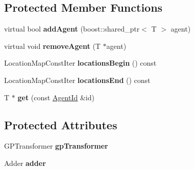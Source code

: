 \subsection*{Protected Member Functions}
\begin{DoxyCompactItemize}
\item 
\hypertarget{classrepast_1_1_base_grid_aa119b75be38ed500437d908707752c53}{virtual bool {\bfseries add\-Agent} (boost\-::shared\-\_\-ptr$<$ T $>$ agent)}\label{classrepast_1_1_base_grid_aa119b75be38ed500437d908707752c53}

\item 
\hypertarget{classrepast_1_1_base_grid_ab3a15e82c71ae8467e34adcef97eda10}{virtual void {\bfseries remove\-Agent} (T $\ast$agent)}\label{classrepast_1_1_base_grid_ab3a15e82c71ae8467e34adcef97eda10}

\item 
\hypertarget{classrepast_1_1_base_grid_af2895a0c0f8df474c70fe1f5dc9d7e79}{Location\-Map\-Const\-Iter {\bfseries locations\-Begin} () const }\label{classrepast_1_1_base_grid_af2895a0c0f8df474c70fe1f5dc9d7e79}

\item 
\hypertarget{classrepast_1_1_base_grid_a4e46f683b8f413cd4ef761791436d0c3}{Location\-Map\-Const\-Iter {\bfseries locations\-End} () const }\label{classrepast_1_1_base_grid_a4e46f683b8f413cd4ef761791436d0c3}

\item 
\hypertarget{classrepast_1_1_base_grid_aab0d37e733a70b57f045f934ca9aa5f6}{T $\ast$ {\bfseries get} (const \hyperlink{classrepast_1_1_agent_id}{Agent\-Id} \&id)}\label{classrepast_1_1_base_grid_aab0d37e733a70b57f045f934ca9aa5f6}

\end{DoxyCompactItemize}
\subsection*{Protected Attributes}
\begin{DoxyCompactItemize}
\item 
\hypertarget{classrepast_1_1_base_grid_a4116ebd80bf98c4d403bfdf1d7891b5e}{G\-P\-Transformer {\bfseries gp\-Transformer}}\label{classrepast_1_1_base_grid_a4116ebd80bf98c4d403bfdf1d7891b5e}

\item 
\hypertarget{classrepast_1_1_base_grid_a268f1e662d2423eb06554c1da59f22c2}{Adder {\bfseries adder}}\label{classrepast_1_1_base_grid_a268f1e662d2423eb06554c1da59f22c2}

\end{DoxyCompactItemize}


